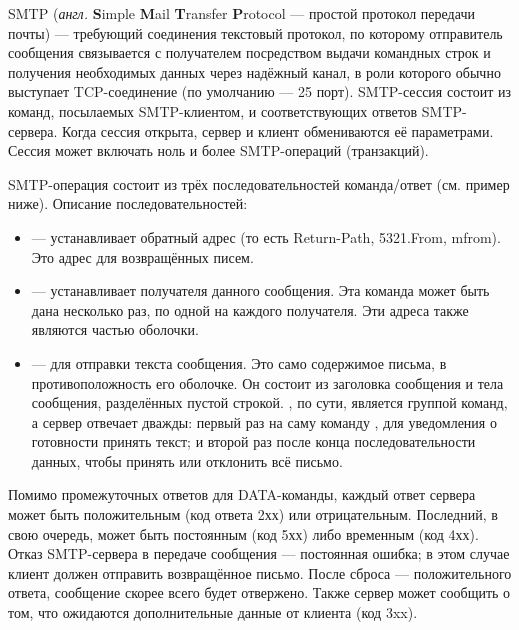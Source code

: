 SMTP (\textit{англ.} \textbf{S}imple \textbf{M}ail \textbf{T}ransfer \textbf{P}rotocol — простой протокол передачи почты) — требующий соединения текстовый протокол, по которому отправитель сообщения связывается с получателем посредством выдачи командных строк и получения необходимых данных через надёжный канал, в роли которого обычно выступает TCP-соединение (по умолчанию — 25 порт).
SMTP-сессия состоит из команд, посылаемых SMTP-клиентом, и соответствующих ответов SMTP-сервера.
Когда сессия открыта, сервер и клиент обмениваются её параметрами. Сессия может включать ноль и более SMTP-операций (транзакций).

SMTP-операция состоит из трёх последовательностей команда/ответ (см. пример ниже).
Описание последовательностей:
\begin{itemize}
	\item {} — устанавливает обратный адрес (то есть Return-Path, 5321.From, mfrom).
	Это адрес для возвращённых писем.
	\item {} — устанавливает получателя данного сообщения.
	Эта команда может быть дана несколько раз, по одной на каждого получателя.
	Эти адреса также являются частью оболочки.
	\item {} — для отправки текста сообщения.
	Это само содержимое письма, в противоположность его оболочке.
	Он состоит из заголовка сообщения и тела сообщения, разделённых пустой строкой.
	, по сути, является группой команд, а сервер отвечает дважды: первый раз на саму команду , для уведомления о готовности принять текст; и второй раз после конца последовательности данных, чтобы принять или отклонить всё письмо.
\end{itemize}

Помимо промежуточных ответов для DATA-команды, каждый ответ сервера может быть положительным (код ответа 2хх) или отрицательным. Последний, в свою очередь, может быть постоянным (код 5хх) либо временным (код 4хх).
Отказ SMTP-сервера в передаче сообщения — постоянная ошибка; в этом случае клиент должен отправить возвращённое письмо.
После сброса — положительного ответа, сообщение скорее всего будет отвержено.
Также сервер может сообщить о том, что ожидаются дополнительные данные от клиента (код 3xx).

